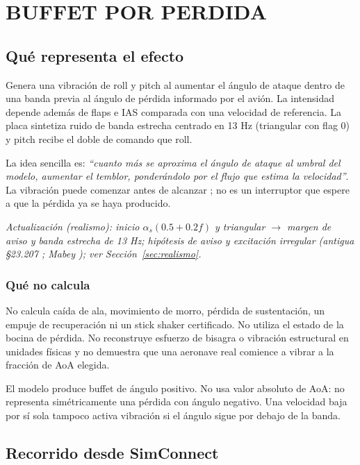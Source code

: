 \section{BUFFET POR PERDIDA}
\label{sec:buffet-perdida}

\subsection{Qué representa el efecto}
Genera una vibración de roll y pitch al aumentar el ángulo de ataque dentro de una banda previa al ángulo de pérdida informado por el avión. La intensidad depende además de flaps e IAS comparada con una velocidad de referencia. La placa sintetiza ruido de banda estrecha centrado en 13 Hz (triangular con flag 0) y pitch recibe el doble de comando que roll.

La idea sencilla es: \emph{``cuanto más se aproxima el ángulo de ataque al umbral del modelo, aumentar el temblor, ponderándolo por el flujo que estima la velocidad''}. La vibración puede comenzar antes de alcanzar ; no es un interruptor que espere a que la pérdida ya se haya producido.

\textit{Actualización (realismo): inicio $\alpha_s(0.5+0.2f)$ y triangular $\rightarrow$ margen de aviso y banda estrecha de 13 Hz; hipótesis de aviso y excitación irregular (antigua §23.207 \cite{cfr23}; Mabey \cite{mabey1988}); ver Sección~\ref{sec:realismo}.}

\subsubsection{Qué no calcula}
No calcula caída de ala, movimiento de morro, pérdida de sustentación, un empuje de recuperación ni un stick shaker certificado. No utiliza el estado de la bocina de pérdida. No reconstruye esfuerzo de bisagra o vibración estructural en unidades físicas y no demuestra que una aeronave real comience a vibrar a la fracción de AoA elegida.

El modelo produce buffet de ángulo positivo. No usa valor absoluto de AoA: no representa simétricamente una pérdida con ángulo negativo. Una velocidad baja por sí sola tampoco activa vibración si el ángulo sigue por debajo de la banda.

\subsection{Recorrido desde SimConnect}
\begin{center}
\end{center}

